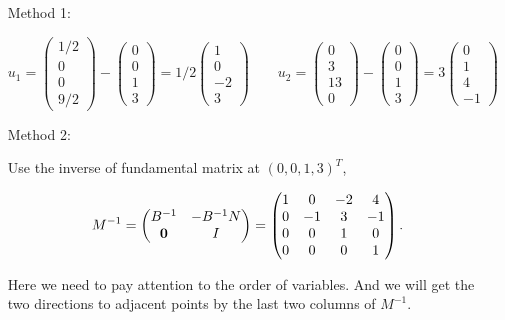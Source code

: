 \documentclass[12pt]{article}
\begin{document}
\begin{enumerate}
\begin{itemize}
\item[Method 1:]

$$
u_1 = \begin{pmatrix}
1/2\\
 0\\
 0\\
 9/2
\end{pmatrix} - \begin{pmatrix}
0\\
0\\
1\\
3
\end{pmatrix} = 1/2 \begin{pmatrix}
1 \\
0 \\
-2 \\
3
\end{pmatrix} \qquad
u_2 = \begin{pmatrix}
0\\
3\\
13\\
0
\end{pmatrix} - \begin{pmatrix}
0\\
0\\
1\\
3
\end{pmatrix} = 3 \begin{pmatrix}
0 \\
1 \\
4 \\
-1
\end{pmatrix}
$$

\item[Method 2:]

Use the inverse of fundamental matrix at $(0, 0, 1, 3)^T$, 

$$M^{-1} = \begin{pmatrix}
B^{-1} & -B^{-1}N \\
\textbf 0 & I
\end{pmatrix} = \begin{pmatrix}
1 & 0 & -2 & 4 \\
0 & -1 & 3 & -1 \\
0 & 0 & 1 & 0 \\
0 & 0 & 0 & 1
\end{pmatrix}.
$$

{\color{red}
Here we need to pay attention to the order of variables.} And we will get the two directions to adjacent points by the last two columns of $M^{-1}$.


\end{itemize}
\end{enumerate}
\end{document}

